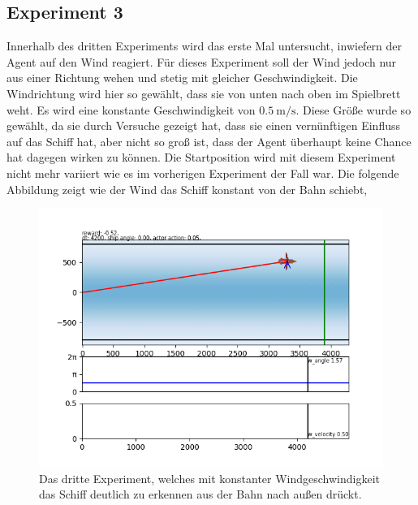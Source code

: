\documentclass[]{iat}
\begin{document}
\subsection*{Experiment 3}
Innerhalb des dritten Experiments wird das erste Mal untersucht, inwiefern der Agent auf den Wind reagiert. Für dieses Experiment soll der Wind jedoch nur aus einer Richtung wehen und stetig mit gleicher Geschwindigkeit. Die Windrichtung wird hier so gewählt, dass sie von unten nach oben im Spielbrett weht. Es wird eine konstante Geschwindigkeit von $\SI{0.5}{\m\per\s}$. Diese Größe wurde so gewählt, da sie durch Versuche gezeigt hat, dass sie einen vernünftigen Einfluss auf das Schiff hat, aber nicht so groß ist, dass der Agent überhaupt keine Chance hat dagegen wirken zu können. Die Startposition wird mit diesem Experiment nicht mehr variiert wie es im vorherigen Experiment der Fall war. Die folgende Abbildung zeigt wie der Wind das Schiff konstant von der Bahn schiebt,
\begin{figure}[H]
    \includegraphics[width=\textwidth]{graphics/settings/s3.png}
    \centering
    \caption{Das dritte Experiment, welches mit konstanter Windgeschwindigkeit das Schiff deutlich zu erkennen aus der Bahn nach außen drückt.}
    \label{abb:setting3}
\end{figure}
\end{document}
